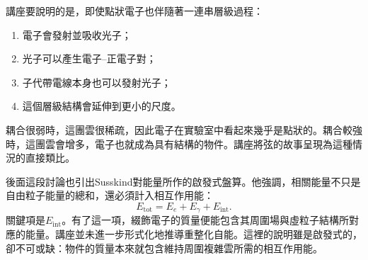 講座要說明的是，即使點狀電子也伴隨著一連串層級過程：
\begin{enumerate}
\item 電子會發射並吸收光子；
\item 光子可以產生電子--正電子對；
\item 子代帶電線本身也可以發射光子；
\item 這個層級結構會延伸到更小的尺度。
\end{enumerate}
耦合很弱時，這團雲很稀疏，因此電子在實驗室中看起來幾乎是點狀的。耦合較強時，這團雲會增多，電子也就成為具有結構的物件。講座將弦的故事呈現為這種情況的直接類比。

後面這段討論也引出Susskind對能量所作的啟發式盤算。他強調，相關能量不只是自由粒子能量的總和，還必須計入相互作用能：
\begin{equation}
E_{\mathrm{tot}} = E_e + E_\gamma + E_{\mathrm{int}}.
\end{equation}
關鍵項是\(E_{\mathrm{int}}\)。有了這一項，綴飾電子的質量便能包含其周圍場與虛粒子結構所對應的能量。講座並未進一步形式化地推導重整化自能。這裡的說明雖是啟發式的，卻不可或缺：物件的質量本來就包含維持周圍複雜雲所需的相互作用能。

\begin{classroomqa}
\end{classroomqa}

\begin{classroomqa}
\end{classroomqa}

\begin{classroomqa}
\end{classroomqa}

